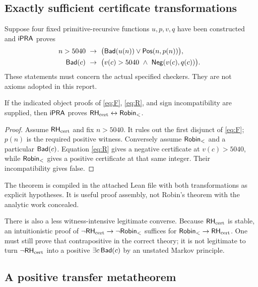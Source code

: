 \subsection{Exactly sufficient certificate transformations}

Suppose four fixed primitive-recursive functions $u,p,v,q$ have been
constructed and $\mathsf{iPRA}$ proves
\begin{align}
 n>5040&\ \to\
       \bigl(\mathsf{Bad}(u(n))\vee\mathsf{Pos}(n,p(n))\bigr),\label{eq:F}\\
 \mathsf{Bad}(c)&\ \to\
       \bigl(v(c)>5040\ \wedge\ \mathsf{Neg}(v(c),q(c))\bigr).\label{eq:R}
\end{align}
These statements must concern the actual specified checkers. They are
not axioms adopted in this report.

\begin{theorem}\label{thm:assembly}
If the indicated object proofs of \eqref{eq:F}, \eqref{eq:R}, and
sign incompatibility are supplied, then $\mathsf{iPRA}$ proves
$\mathsf{RH}_{\rm cert}\leftrightarrow\mathsf{Robin}_{<}$.
\end{theorem}
\begin{proof}
Assume $\mathsf{RH}_{\rm cert}$ and fix $n>5040$. It rules out the first disjunct of
\eqref{eq:F}; $p(n)$ is the required positive witness.
Conversely assume $\mathsf{Robin}_{<}$ and a particular $\mathsf{Bad}(c)$.
Equation \eqref{eq:R} gives a negative certificate at $v(c)>5040$,
while $\mathsf{Robin}_{<}$ gives a positive certificate at that same integer.
Their incompatibility gives false.
\end{proof}

The theorem is compiled in the attached Lean file with both
transformations as explicit hypotheses. It is useful proof assembly,
not Robin's theorem with the analytic work concealed.

There is also a less witness-intensive legitimate converse. Because
$\mathsf{RH}_{\rm cert}$ is stable, an intuitionistic proof of
$\neg\mathsf{RH}_{\rm cert}\to\neg\mathsf{Robin}_{<}$ suffices for $\mathsf{Robin}_{<}\to\mathsf{RH}_{\rm cert}$.
One must still prove that contrapositive in the correct theory;
it is not legitimate to turn $\neg\mathsf{RH}_{\rm cert}$ into a positive
$\exists c\,\mathsf{Bad}(c)$ by an unstated Markov principle.

\subsection{A positive transfer metatheorem}

